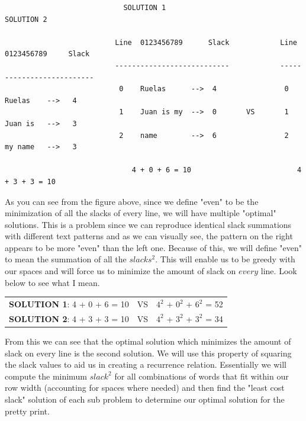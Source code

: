 \documentclass[11pt]{article}
\begin{document}
\begin{solution}
	\hfil
	
		\begin{center}
			\begin{verbatim}
			                SOLUTION 1                             SOLUTION 2
			
				          Line  0123456789      Slack            Line  0123456789     Slack
				          ---------------------------            --------------------------
				           0    Ruelas      -->  4                0    Ruelas    -->   4
				           1    Juan is my  -->  0       VS       1    Juan is   -->   3
				           2    name        -->  6                2    my name   -->   3
				           		                    
				              4 + 0 + 6 = 10                         4 + 3 + 3 = 10                                     	
			\end{verbatim}				
		\end{center} 
		
		As you can see from the figure above, since we define "even" to be the minimization of all the slacks of every line, we will have multiple "optimal" solutions. This is a problem since we can reproduce identical slack summations with different text patterns and as we can visually see, the pattern on the right appears to be more "even" than the left one. Because of this, we will define "even" to mean the summation of all the $slacks^2$. This will enable us to be greedy with our spaces and will force us to minimize the amount of slack on $every$ line. Look below to see what I mean.
		
		\hfil
		
		
		\begin{center}
			\begin{tabular}{c c c}
			    \textbf{SOLUTION 1}: 4 + 0 + 6 = 10 & VS & $4^2$ + $0^2$ + $6^2$ = 52 \\
				\textbf{SOLUTION 2}: 4 + 3 + 3 = 10 & VS & $4^2$ + $3^2$ + $3^2$ = 34
			\end{tabular}
		\end{center}
		
		\hfil
		
		From this we can see that the optimal solution which minimizes the amount of slack on every line is the second solution. We will use this property of squaring the slack values to aid us in creating a recurrence relation. Essentially we will compute the minimum $slack^2$ for all combinations of words that fit within our row width (accounting for spaces where needed) and then find the "least cost slack" solution of each sub problem to determine our optimal solution for the pretty print. 
		

\end{solution}
\end{document}
